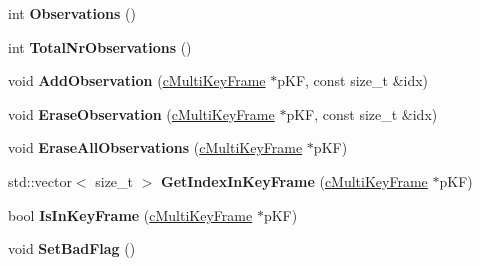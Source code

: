 \begin{DoxyCompactItemize}
\item 
int {\bfseries Observations} ()\hypertarget{classMultiColSLAM_1_1cMapPoint_a05fed41d71bf8d37d4c7df7bad3847ff}{}\label{classMultiColSLAM_1_1cMapPoint_a05fed41d71bf8d37d4c7df7bad3847ff}

\item 
int {\bfseries Total\+Nr\+Observations} ()\hypertarget{classMultiColSLAM_1_1cMapPoint_a21b08bf8f6e9a8b8d23785c3753edee2}{}\label{classMultiColSLAM_1_1cMapPoint_a21b08bf8f6e9a8b8d23785c3753edee2}

\item 
void {\bfseries Add\+Observation} (\hyperlink{classMultiColSLAM_1_1cMultiKeyFrame}{c\+Multi\+Key\+Frame} $\ast$p\+KF, const size\+\_\+t \&idx)\hypertarget{classMultiColSLAM_1_1cMapPoint_a0a9257b2c9160932bce07dd197e6c689}{}\label{classMultiColSLAM_1_1cMapPoint_a0a9257b2c9160932bce07dd197e6c689}

\item 
void {\bfseries Erase\+Observation} (\hyperlink{classMultiColSLAM_1_1cMultiKeyFrame}{c\+Multi\+Key\+Frame} $\ast$p\+KF, const size\+\_\+t \&idx)\hypertarget{classMultiColSLAM_1_1cMapPoint_a643edc73b2e5b022952572086da211b7}{}\label{classMultiColSLAM_1_1cMapPoint_a643edc73b2e5b022952572086da211b7}

\item 
void {\bfseries Erase\+All\+Observations} (\hyperlink{classMultiColSLAM_1_1cMultiKeyFrame}{c\+Multi\+Key\+Frame} $\ast$p\+KF)\hypertarget{classMultiColSLAM_1_1cMapPoint_aaa87f52cb969cb98444f78b13afd34d9}{}\label{classMultiColSLAM_1_1cMapPoint_aaa87f52cb969cb98444f78b13afd34d9}

\item 
std\+::vector$<$ size\+\_\+t $>$ {\bfseries Get\+Index\+In\+Key\+Frame} (\hyperlink{classMultiColSLAM_1_1cMultiKeyFrame}{c\+Multi\+Key\+Frame} $\ast$p\+KF)\hypertarget{classMultiColSLAM_1_1cMapPoint_a27867b8673bcb8abad20ae18b0b31b20}{}\label{classMultiColSLAM_1_1cMapPoint_a27867b8673bcb8abad20ae18b0b31b20}

\item 
bool {\bfseries Is\+In\+Key\+Frame} (\hyperlink{classMultiColSLAM_1_1cMultiKeyFrame}{c\+Multi\+Key\+Frame} $\ast$p\+KF)\hypertarget{classMultiColSLAM_1_1cMapPoint_a8f95a7ecd79c17f64ab772749eae1e6c}{}\label{classMultiColSLAM_1_1cMapPoint_a8f95a7ecd79c17f64ab772749eae1e6c}

\item 
void {\bfseries Set\+Bad\+Flag} ()\hypertarget{classMultiColSLAM_1_1cMapPoint_aa6682353979a077c0c1c4d3b6dd6c870}{}\label{classMultiColSLAM_1_1cMapPoint_aa6682353979a077c0c1c4d3b6dd6c870}


\end{DoxyCompactItemize}
